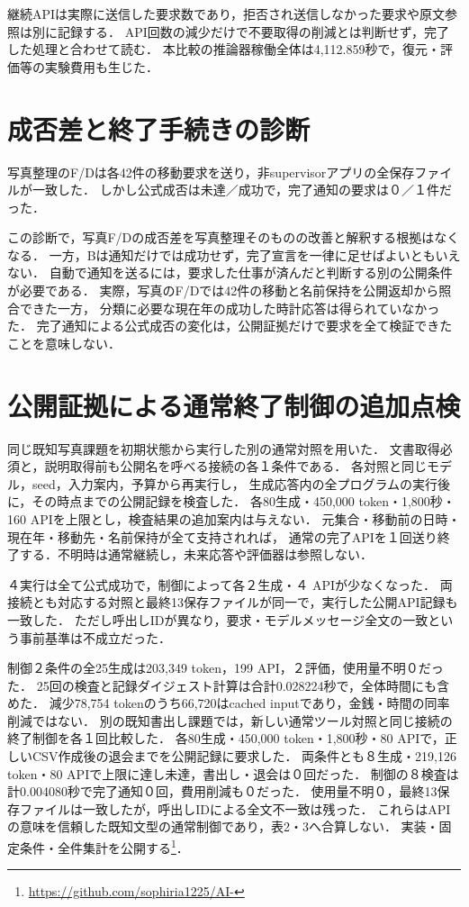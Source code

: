 \documentclass[uplatex,a4paper,twocolumn,10pt]{jsarticle}
\begin{document}
継続APIは実際に送信した要求数であり，拒否され送信しなかった要求や原文参照は別に記録する．
API回数の減少だけで不要取得の削減とは判断せず，完了した処理と合わせて読む．
本比較の推論器稼働全体は4,112.859秒で，復元・評価等の実験費用も生じた．

\section{成否差と終了手続きの診断}
写真整理のF/Dは各42件の移動要求を送り，非supervisorアプリの全保存ファイルが一致した．
しかし公式成否は未達／成功で，完了通知の要求は０／１件だった．

この診断で，写真F/Dの成否差を写真整理そのものの改善と解釈する根拠はなくなる．
一方，Bは通知だけでは成功せず，完了宣言を一律に足せばよいともいえない．
自動で通知を送るには，要求した仕事が済んだと判断する別の公開条件が必要である．
実際，写真のF/Dでは42件の移動と名前保持を公開返却から照合できた一方，
分類に必要な現在年の成功した時計応答は得られていなかった．
完了通知による公式成否の変化は，公開証拠だけで要求を全て検証できたことを意味しない．

\section{公開証拠による通常終了制御の追加点検}
同じ既知写真課題を初期状態から実行した別の通常対照を用いた．
文書取得必須と，説明取得前も公開名を呼べる接続の各１条件である．
各対照と同じモデル，seed，入力案内，予算から再実行し，
生成応答内の全プログラムの実行後に，その時点までの公開記録を検査した．
各80生成・450,000 token・1,800秒・160 APIを上限とし，検査結果の追加案内は与えない．
元集合・移動前の日時・現在年・移動先・名前保持が全て支持されれば，
通常の完了APIを１回送り終了する．不明時は通常継続し，未来応答や評価器は参照しない．

４実行は全て公式成功で，制御によって各２生成・４ APIが少なくなった．
両接続とも対応する対照と最終13保存ファイルが同一で，実行した公開API記録も一致した．
ただし呼出しIDが異なり，要求・モデルメッセージ全文の一致という事前基準は不成立だった．

制御２条件の全25生成は203,349 token，199 API，２評価，使用量不明０だった．
25回の検査と記録ダイジェスト計算は合計0.028224秒で，全体時間にも含めた．
減少78,754 tokenのうち66,720はcached inputであり，金銭・時間の同率削減ではない．
別の既知書出し課題では，新しい通常ツール対照と同じ接続の終了制御を各１回比較した．
各80生成・450,000 token・1,800秒・80 APIで，正しいCSV作成後の退会までを公開記録に要求した．
両条件とも８生成・219,126 token・80 APIで上限に達し未達，書出し・退会は０回だった．
制御の８検査は計0.004080秒で完了通知０回，費用削減も０だった．
使用量不明０，最終13保存ファイルは一致したが，呼出しIDによる全文不一致は残った．
これらはAPIの意味を信頼した既知文型の通常制御であり，表2・3へ合算しない．
実装・固定条件・全件集計を公開する\footnote{\url{https://github.com/sophiria1225/AI-}}．
\end{document}
